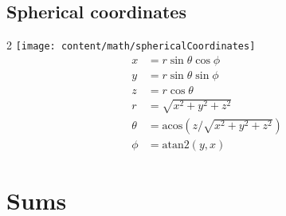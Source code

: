 \subsection{Spherical coordinates}
\setlength{\columnseprule}{0pt}
\begin {multicols}{2}
\texttt{[image: content/math/sphericalCoordinates]}
\\
\begin{align*}
x &= r\sin\theta\cos\phi \\
y &= r\sin\theta\sin\phi \\
z &= r\cos\theta \\
r &= \sqrt{x^2+y^2+z^2}\\
\theta &= \textrm{acos}(z/\sqrt{x^2+y^2+z^2})\\
\phi &= \textrm{atan2}(y,x)
\end{align*}
\end{multicols}
\setlength{\columnseprule}{0.5pt}

\section{Sums}
\small
{}

